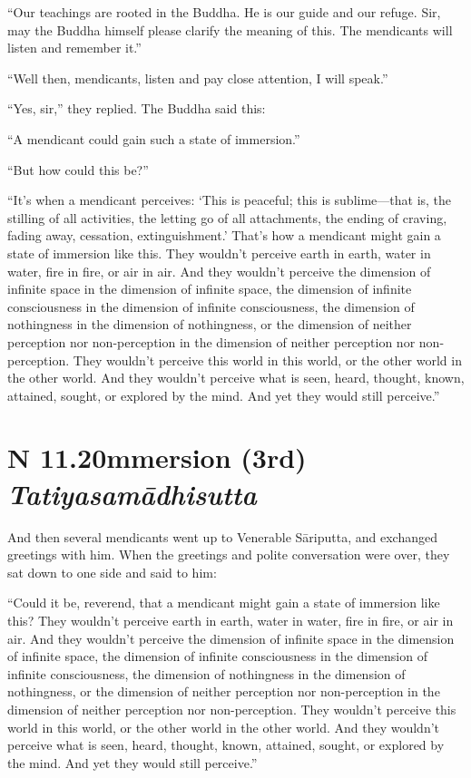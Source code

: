 \documentclass[12pt,openany]{book}%
\newcommand*{\suttatitleacronym}[1]{\smaller[2]{#1}\vspace*{.3em}}
\newcommand*{\suttatitletranslation}[1]{\linebreak{#1}}
\newcommand*{\suttatitleroot}[1]{\linebreak\smaller[2]\itshape{#1}}
\newcommand*{\tocacronym}[1]{\hspace*{-3.3em}{#1}\quad}
\newcommand*{\toctranslation}[1]{#1}
\newcommand*{\tocroot}[1]{(\textit{#1})}
\begin{document}
“Our teachings are rooted in the Buddha. He is our guide and our refuge. Sir, may the Buddha himself please clarify the meaning of this. The mendicants will listen and remember it.” 

“Well then, mendicants, listen and pay close attention, I will speak.” 

“Yes, sir,” they replied. The Buddha said this: 

“A mendicant could gain such a state of immersion.” 

“But how could this be?” 

“It’s when a mendicant perceives: ‘This is peaceful; this is sublime—that is, the stilling of all activities, the letting go of all attachments, the ending of craving, fading away, cessation, extinguishment.’ That’s how a mendicant might gain a state of immersion like this. They wouldn’t perceive earth in earth, water in water, fire in fire, or air in air. And they wouldn’t perceive the dimension of infinite space in the dimension of infinite space, the dimension of infinite consciousness in the dimension of infinite consciousness, the dimension of nothingness in the dimension of nothingness, or the dimension of neither perception nor non-perception in the dimension of neither perception nor non-perception. They wouldn’t perceive this world in this world, or the other world in the other world. And they wouldn’t perceive what is seen, heard, thought, known, attained, sought, or explored by the mind. And yet they would still perceive.” 

%
\section*{{\suttatitleacronym AN 11.20}{\suttatitletranslation Immersion (3rd) }{\suttatitleroot Tatiyasamādhisutta}}
\addcontentsline{toc}{section}{\tocacronym{AN 11.20} \toctranslation{Immersion (3rd) } \tocroot{Tatiyasamādhisutta}}

And then several mendicants went up to Venerable \textsanskrit{Sāriputta}, and exchanged greetings with him. When the greetings and polite conversation were over, they sat down to one side and said to him: 

“Could it be, reverend, that a mendicant might gain a state of immersion like this? They wouldn’t perceive earth in earth, water in water, fire in fire, or air in air. And they wouldn’t perceive the dimension of infinite space in the dimension of infinite space, the dimension of infinite consciousness in the dimension of infinite consciousness, the dimension of nothingness in the dimension of nothingness, or the dimension of neither perception nor non-perception in the dimension of neither perception nor non-perception. They wouldn’t perceive this world in this world, or the other world in the other world. And they wouldn’t perceive what is seen, heard, thought, known, attained, sought, or explored by the mind. And yet they would still perceive.” 
\end{document}
